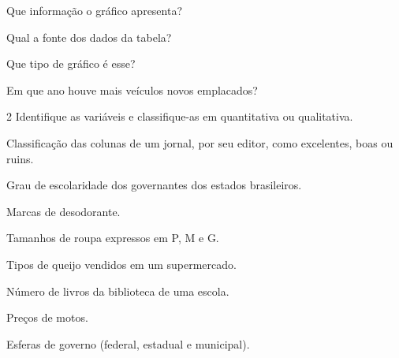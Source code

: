\begin{escolha}
\item
  Que informação o gráfico apresenta?
\item{}

\item
  Qual a fonte dos dados da tabela?
\item{}

\item
  Que tipo de gráfico é esse?
\item{}

\item
  Em que ano houve mais veículos novos emplacados?
\item{}
\end{escolha}

\num{2} Identifique as variáveis e classifique-as em quantitativa 
ou qualitativa.

\begin{escolha}
\item
  Classificação das colunas de um jornal, por seu editor, como
  excelentes, boas ou ruins.

\item {}

\item
  Grau de escolaridade dos governantes dos estados brasileiros.
\item{}

\item
  Marcas de desodorante.
\item{}

\item
  Tamanhos de roupa expressos em P, M e G.
\item{}

\item
  Tipos de queijo vendidos em um supermercado.
\item{}

\item
  Número de livros da biblioteca de uma escola.
\item{}

\item
  Preços de motos.
\item{}

\item
  Esferas de governo (federal, estadual e municipal).
\item{}
\end{escolha}

